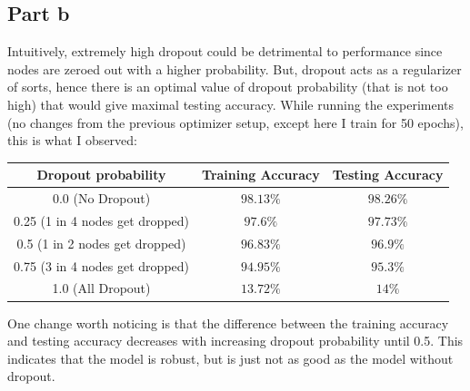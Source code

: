 \documentclass{article}
\begin{document}
\subsection*{Part b}
\begin{flushleft}
Intuitively, extremely high dropout could be detrimental to performance since nodes are zeroed out with a higher probability. But, dropout acts as a regularizer of sorts, hence there is an optimal value of dropout probability (that is not too high) that would give maximal testing accuracy. While running the experiments (no changes from the previous optimizer setup, except here I train for 50 epochs), this is what I observed:
\begin{center}
\begin{tabular}{|c|c|c|}
\hline
Dropout probability & Training Accuracy & Testing Accuracy\\
\hline
\hline
0.0 (No Dropout) & \(98.13\%\) & \(98.26\%\)\\
\hline
0.25 (1 in 4 nodes get dropped) & \(97.6\%\) & \(97.73\%\)\\
\hline
0.5 (1 in 2 nodes get dropped) & \(96.83\%\) & \(96.9\%\)\\
\hline
0.75 (3 in 4 nodes get dropped) & \(94.95\%\) & \(95.3\%\)\\
\hline
1.0 (All Dropout) & \(13.72\%\) & \(14\%\)\\
\hline
\end{tabular}
\end{center}

One change worth noticing is that the difference between the training accuracy and testing accuracy decreases with increasing dropout probability until 0.5. This indicates that the model is robust, but is just not as good as the model without dropout.
\end{flushleft}
\end{document}
